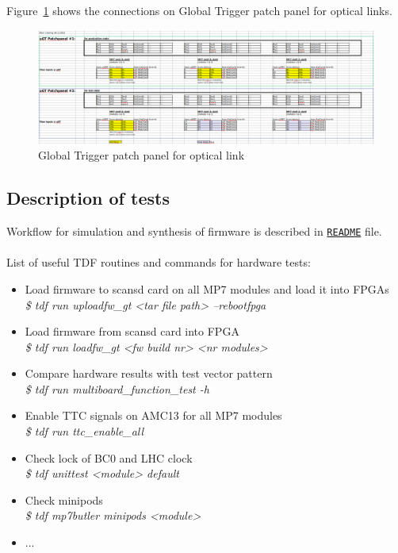 Figure~\ref{fig:app:ugt_pp} shows the connections on Global Trigger patch panel for optical links.

\begin{figure}[htb]
\centering
\includegraphics[width=15cm]{figures/ugt_patchpanel}
\caption{Global Trigger patch panel for optical link}
\label{fig:app:ugt_pp}
\end{figure}

\subsection{Description of tests}\label{sec:app:app_e}

Workflow for simulation and synthesis of firmware is described in \href{\gitbranch/README.md}{\texttt{README}} file.\\\\
List of useful TDF routines and commands for hardware tests:
\begin{itemize}
\item Load firmware to scansd card on all MP7 modules and load it into FPGAs\\
\textit{\small{\$ tdf run uploadfw\_gt <tar file path> --rebootfpga}}
\item Load firmware from scansd card into FPGA\\
\textit{\small{\$ tdf run loadfw\_gt <fw build nr> <nr modules>}}
\item Compare hardware results with test vector pattern\\
\textit{\small{\$ tdf run multiboard\_function\_test -h}}
\item Enable TTC signals on AMC13 for all MP7 modules\\
\textit{\small{\$ tdf run ttc\_enable\_all}}
\item Check lock of BC0 and LHC clock\\
\textit{\small{\$ tdf unittest <module> default}}
\item Check minipods\\
\textit{\small{\$ tdf mp7butler minipods <module>}}
\item ...\\
\end{itemize}

\clearpage
